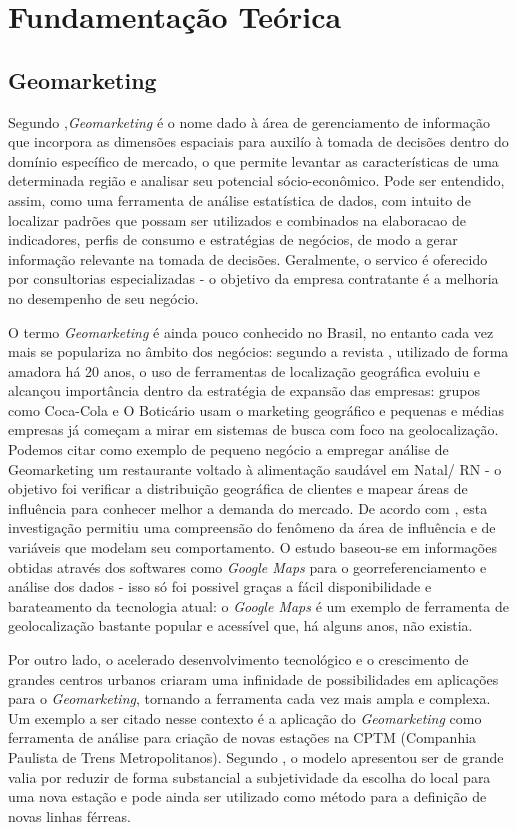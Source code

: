 
\chapter{Fundamentação Teórica}
\label{fundamentacao-teorica}

\section {Geomarketing}
\label{Geom}
Segundo ,\emph{Geomarketing} é o nome dado à área de gerenciamento de informação que incorpora as dimensões espaciais para auxilío à tomada de decisões dentro do domínio específico de mercado, o que permite levantar as características de uma determinada região e analisar seu potencial sócio-econômico. Pode ser entendido, assim, como uma ferramenta de análise estatística de dados, com intuito de localizar padrões que possam ser utilizados e combinados na elaboracao de indicadores, perfis de consumo e estratégias de negócios, de modo a gerar informação relevante na tomada de decisões. Geralmente, o servico é oferecido por consultorias especializadas - o  objetivo da empresa  contratante é a melhoria no desempenho de seu negócio.

O termo \emph{Geomarketing} é ainda pouco conhecido no Brasil, no entanto cada vez mais se populariza no âmbito dos negócios: segundo a revista , utilizado de forma amadora há 20 anos, o uso de ferramentas de localização geográfica evoluiu e alcançou importância dentro da estratégia de expansão das empresas: grupos como Coca-Cola e O Boticário usam o marketing geográfico e pequenas e médias empresas já começam a mirar em sistemas de busca com foco na geolocalização. Podemos citar como exemplo de pequeno negócio a empregar análise de Geomarketing um restaurante voltado à alimentação saudável em Natal/ RN - o objetivo foi verificar a distribuição geográfica de clientes e mapear áreas de influência para conhecer melhor a demanda do mercado. De acordo com , esta investigação permitiu uma compreensão do fenômeno da área de influência e de variáveis que modelam seu comportamento. O estudo baseou-se em informações obtidas através dos softwares como \emph{Google Maps} para o georreferenciamento e análise dos dados - isso só foi possivel graças a fácil disponibilidade e barateamento da tecnologia atual: o \emph{Google Maps} é um exemplo de ferramenta de geolocalização bastante popular e acessível que, há alguns anos, não existia. 

Por outro lado, o acelerado desenvolvimento tecnológico e o crescimento de grandes centros urbanos criaram uma infinidade de possibilidades em aplicações para o \emph{Geomarketing}, tornando a ferramenta cada vez mais ampla e complexa. Um exemplo a ser citado nesse contexto é a aplicação do \emph{Geomarketing} como ferramenta de análise para criação de novas estações na CPTM (Companhia Paulista de Trens Metropolitanos). Segundo , o modelo apresentou ser de grande valia por reduzir de forma substancial a subjetividade da escolha do local para uma nova estação e pode ainda ser utilizado como método para a definição de novas linhas férreas.

